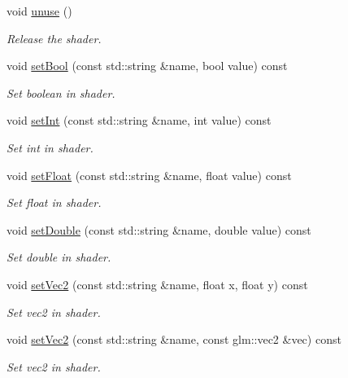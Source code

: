 \begin{DoxyCompactItemize}
\mbox{\label{class_shader_a8eb0c22bd8a71aaf85f4ce7a4102fa34}} 
void \hyperlink{class_shader_a8eb0c22bd8a71aaf85f4ce7a4102fa34}{unuse} ()
\begin{DoxyCompactList}\small\item\em Release the shader. \end{DoxyCompactList}\item 
void \hyperlink{class_shader_ab1a56d6c299bd7eaa18c2e142ef7bd9f}{set\+Bool} (const std\+::string \&name, bool value) const
\begin{DoxyCompactList}\small\item\em Set boolean in shader. \end{DoxyCompactList}\item 
void \hyperlink{class_shader_ad362e2b654cd95a3574cd505411e41fd}{set\+Int} (const std\+::string \&name, int value) const
\begin{DoxyCompactList}\small\item\em Set int in shader. \end{DoxyCompactList}\item 
void \hyperlink{class_shader_afe7367621f74c2d26431d8ac15252bf3}{set\+Float} (const std\+::string \&name, float value) const
\begin{DoxyCompactList}\small\item\em Set float in shader. \end{DoxyCompactList}\item 
void \hyperlink{class_shader_a2108f2fe0928892a9c6151c36a9ae0a8}{set\+Double} (const std\+::string \&name, double value) const
\begin{DoxyCompactList}\small\item\em Set double in shader. \end{DoxyCompactList}\item 
void \hyperlink{class_shader_afb91bc9e954bf590857c96ab1331b0ec}{set\+Vec2} (const std\+::string \&name, float x, float y) const
\begin{DoxyCompactList}\small\item\em Set vec2 in shader. \end{DoxyCompactList}\item 
void \hyperlink{class_shader_a13fb5e7a8297134df2cb6a3d07d63143}{set\+Vec2} (const std\+::string \&name, const glm\+::vec2 \&vec) const
\begin{DoxyCompactList}\small\item\em Set vec2 in shader. \end{DoxyCompactList}\item 

\end{DoxyCompactItemize}
